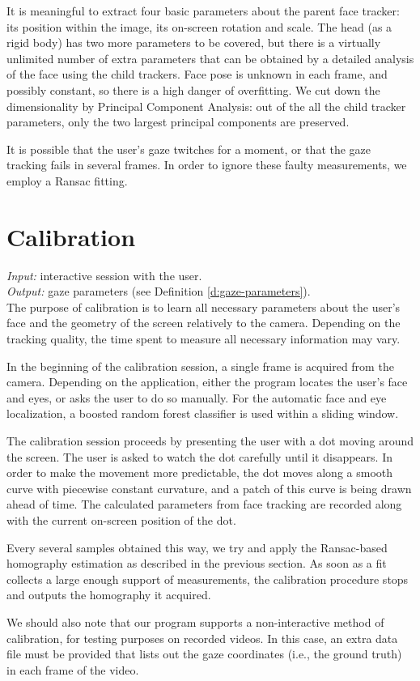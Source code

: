 It is meaningful to extract four basic parameters about the parent face tracker: its position within the image, its on-screen rotation and scale.
The head (as a rigid body) has two more parameters to be covered, but there is a virtually unlimited number of extra parameters that can be obtained by a detailed analysis of the face using the child trackers.
Face pose is unknown in each frame, and possibly constant, so there is a high danger of overfitting.
We cut down the dimensionality by Principal Component Analysis: out of the all the child tracker parameters, only the two largest principal components are preserved.

It is possible that the user's gaze twitches for a moment, or that the gaze tracking fails in several frames.
In order to ignore these faulty measurements, we employ a Ransac fitting.

\section{Calibration}

\textit{Input:} interactive session with the user.\\
\textit{Output:} gaze parameters (see Definition \ref{d:gaze-parameters}).\\

The purpose of calibration is to learn all necessary parameters about the user's face and the geometry of the screen relatively to the camera.
Depending on the tracking quality, the time spent to measure all necessary information may vary.

In the beginning of the calibration session, a single frame is acquired from the camera.
Depending on the application, either the program locates the user's face and eyes, or asks the user to do so manually.
For the automatic face and eye localization, a boosted random forest classifier is used within a sliding window.

The calibration session proceeds by presenting the user with a dot moving around the screen.
The user is asked to watch the dot carefully until it disappears.
In order to make the movement more predictable, the dot moves along a smooth curve with piecewise constant curvature, and a patch of this curve is being drawn ahead of time.
The calculated parameters from face tracking are recorded along with the current on-screen position of the dot.

Every several samples obtained this way, we try and apply the Ransac-based homography estimation as described in the previous section.
As soon as a fit collects a large enough support of measurements, the calibration procedure stops and outputs the homography it acquired.

We should also note that our program supports a non-interactive method of calibration, for testing purposes on recorded videos.
In this case, an extra data file must be provided that lists out the gaze coordinates (i.e., the ground truth) in each frame of the video.
